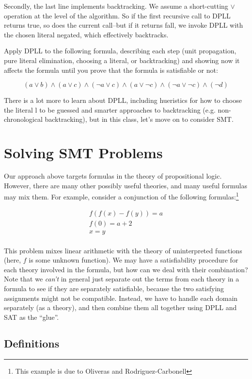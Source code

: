 \documentclass[11pt]{article}
\begin{document}
Secondly, the last line implements backtracking. We assume a short-cutting
$\lor$ operation at the level of the algorithm. So if the first recursive call
to DPLL returns true, so does the current call--but if it returns fall, we
invoke DPLL with the chosen literal negated, which effectively backtracks.

 Apply DPLL to the following formula, describing each step (unit
propagation, pure literal elimination, choosing a literal, or backtracking) and
showing now it affects the formula until you prove that the formula is
satisfiable or not:

\[
(a \lor b) \land (a \lor c) \land (\lnot a \lor c) \land (a \lor \lnot c) \land (\lnot a \lor \lnot c) \land (\lnot d)
\]

There is a lot more to learn about DPLL, including hueristics for how to choose
the literal l to be guessed and smarter approaches to backtracking (e.g.
non-chronological backtracking), but in this class, let's move on to consider
SMT.


\section{Solving SMT Problems}

Our approach above targets formulas in the theory of propositional logic.
However, there are many other possibly useful theories, and many useful formulas
may mix them. For example, consider a conjunction of the following
formulas:\footnote{This example is due to Oliveras and Rodriguez-Carbonell}

\[
\begin{array}{l}
f(f(x)-f(y)) = a \\
f(0) = a+2 \\
x = y \\
\end{array}
\]

This problem mixes linear arithmetic with the theory of uninterpreted functions
(here, $f$ is some unknown function). We may have a satisfiability procedure for
each theory involved in the formula, but how can we deal with their combination?
Note that we \emph{can't} in general just separate out the terms from each
theory in a formula to see if they are separately satisfiable, because the two
satisfying assignments might not be compatible.  Instead, we have to handle each
domain separately (as a theory), and then combine them all together using DPLL
and SAT as the ``glue''. 

\subsection{Definitions} 
\end{document}
